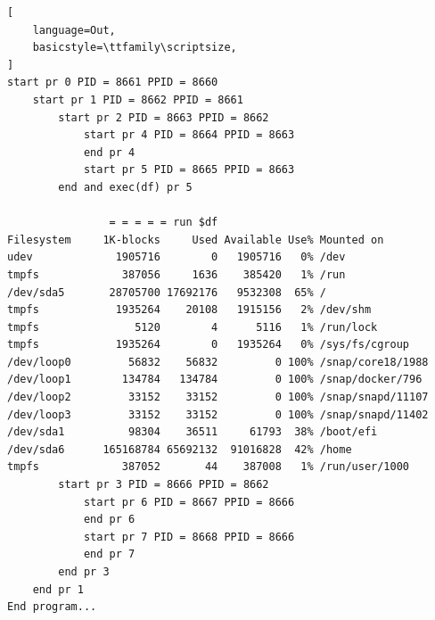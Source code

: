 \begin{lstlisting}[
    language=Out,
    basicstyle=\ttfamily\scriptsize,
]
start pr 0 PID = 8661 PPID = 8660
	start pr 1 PID = 8662 PPID = 8661
		start pr 2 PID = 8663 PPID = 8662
			start pr 4 PID = 8664 PPID = 8663
			end pr 4
			start pr 5 PID = 8665 PPID = 8663
		end and exec(df) pr 5

				= = = = = run $df
Filesystem     1K-blocks     Used Available Use% Mounted on
udev             1905716        0   1905716   0% /dev
tmpfs             387056     1636    385420   1% /run
/dev/sda5       28705700 17692176   9532308  65% /
tmpfs            1935264    20108   1915156   2% /dev/shm
tmpfs               5120        4      5116   1% /run/lock
tmpfs            1935264        0   1935264   0% /sys/fs/cgroup
/dev/loop0         56832    56832         0 100% /snap/core18/1988
/dev/loop1        134784   134784         0 100% /snap/docker/796
/dev/loop2         33152    33152         0 100% /snap/snapd/11107
/dev/loop3         33152    33152         0 100% /snap/snapd/11402
/dev/sda1          98304    36511     61793  38% /boot/efi
/dev/sda6      165168784 65692132  91016828  42% /home
tmpfs             387052       44    387008   1% /run/user/1000
		start pr 3 PID = 8666 PPID = 8662
			start pr 6 PID = 8667 PPID = 8666
			end pr 6
			start pr 7 PID = 8668 PPID = 8666
			end pr 7
		end pr 3
	end pr 1
End program...
\end{lstlisting}
